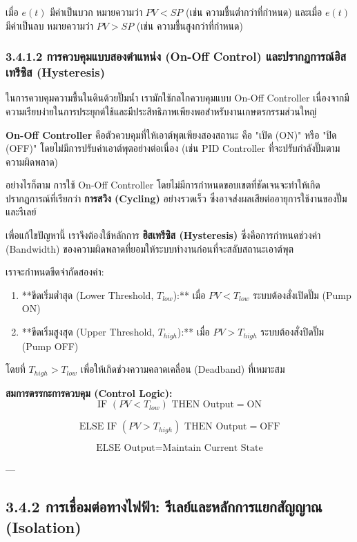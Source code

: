 \documentclass[11pt,a4paper,openany]{report}
\begin{document}
เมื่อ $e(t)$ มีค่าเป็นบวก หมายความว่า $PV < SP$ (เช่น ความชื้นต่ำกว่าที่กำหนด) และเมื่อ $e(t)$ มีค่าเป็นลบ หมายความว่า $PV > SP$ (เช่น ความชื้นสูงกว่าที่กำหนด)

\subsubsection{3.4.1.2 การควบคุมแบบสองตำแหน่ง (On-Off Control) และปรากฏการณ์ฮิสเทรีซิส (Hysteresis)}


ในการควบคุมความชื้นในดินด้วยปั๊มน้ำ เรามักใช้กลไกควบคุมแบบ On-Off Controller เนื่องจากมีความเรียบง่ายในการประยุกต์ใช้และมีประสิทธิภาพเพียงพอสำหรับงานเกษตรกรรมส่วนใหญ่

\textbf{On-Off Controller} คือตัวควบคุมที่ให้เอาต์พุตเพียงสองสถานะ คือ "เปิด (ON)" หรือ "ปิด (OFF)" โดยไม่มีการปรับค่าเอาต์พุตอย่างต่อเนื่อง (เช่น PID Controller ที่จะปรับกำลังปั๊มตามความผิดพลาด)

อย่างไรก็ตาม การใช้ On-Off Controller โดยไม่มีการกำหนดขอบเขตที่ชัดเจนจะทำให้เกิดปรากฏการณ์ที่เรียกว่า \textbf{การสวิง (Cycling)} อย่างรวดเร็ว ซึ่งอาจส่งผลเสียต่ออายุการใช้งานของปั๊มและรีเลย์

เพื่อแก้ไขปัญหานี้ เราจึงต้องใช้หลักการ \textbf{ฮิสเทรีซิส (Hysteresis)} ซึ่งคือการกำหนดช่วงค่า (Bandwidth) ของความผิดพลาดที่ยอมให้ระบบทำงานก่อนที่จะสลับสถานะเอาต์พุต

เราจะกำหนดขีดจำกัดสองค่า:
\begin{enumerate}
  \item **ขีดเริ่มต่ำสุด (Lower Threshold, $T_{low}$):** เมื่อ $PV < T_{low}$ ระบบต้องสั่งเปิดปั๊ม (Pump ON)
  \item **ขีดเริ่มสูงสุด (Upper Threshold, $T_{high}$):** เมื่อ $PV > T_{high}$ ระบบต้องสั่งปิดปั๊ม (Pump OFF)
\end{enumerate}


โดยที่ $T_{high} > T_{low}$ เพื่อให้เกิดช่วงความคลาดเคลื่อน (Deadband) ที่เหมาะสม

\textbf{สมการตรรกะการควบคุม (Control Logic):}
$$\text{IF } (PV < T_{low}) \text{ THEN } \text{Output} = \text{ON}$$

$$\text{ELSE IF } (PV > T_{high}) \text{ THEN } \text{Output} = \text{OFF}$$

$$\text{ELSE } \text{Output} = \text{Maintain Current State}$$


---

\subsection{3.4.2 การเชื่อมต่อทางไฟฟ้า: รีเลย์และหลักการแยกสัญญาณ (Isolation)}
\end{document}
